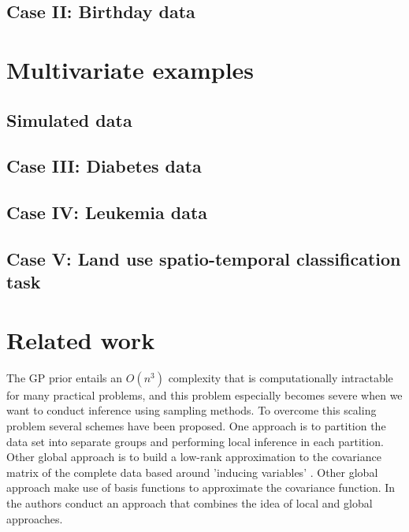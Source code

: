 \documentclass[]{interact}
\theoremstyle{plain}%
\theoremstyle{definition}
\theoremstyle{remark}
\begin{document}
\subsection{Case II: Birthday data}\label{sec:bf_caseIII}

\vspace{3mm}
\section{Multivariate examples}\label{sec:gp_examplesMulti}
\subsection{Simulated data}\label{sec:bf_toyexampleMulti}
\subsection{Case III: Diabetes data}\label{sec:bf_caseIV}
\subsection{Case IV: Leukemia data}\label{sec:bf_caseV}
\subsection{Case V: Land use spatio-temporal classification task}\label{sec:bf_caseVII}

\vspace{3mm}
\appendix

\section{Related work}

The GP prior entails an $O(n^3)$ complexity that is computationally intractable for many practical problems, and this problem especially becomes severe when we want to conduct inference using sampling methods. To overcome this scaling problem several schemes have been proposed. One approach is to partition the data set into separate groups \citep{snelson2007local, urtasun2008sparse} and performing local inference in each partition. Other global approach is to build a low-rank approximation to the covariance matrix of the complete data based around 'inducing variables' \citep{quinonero2005unifying,bui2017unifying}. Other global approach make use of basis functions to approximate the covariance function. In \cite{snelson2007local} the authors conduct an approach that combines the idea of local and global approaches.
\end{document}
